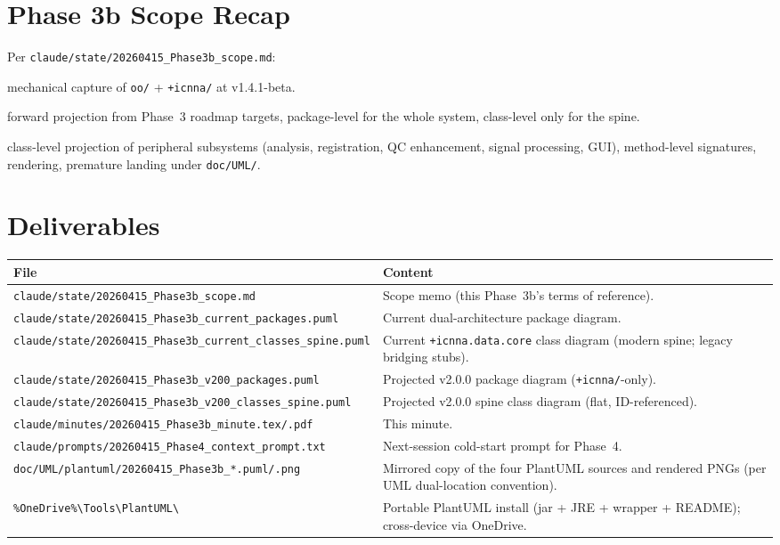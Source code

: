 \documentclass[11pt,a4paper]{article}
\begin{document}
\section{Phase 3b Scope Recap}

Per \texttt{claude/state/20260415\_Phase3b\_scope.md}:

\begin{description}[style=nextline]
    \item[3b.1 (current snapshot):] mechanical capture of \texttt{oo/} + \texttt{+icnna/} at v1.4.1-beta.
    \item[3b.2 (v2.0.0 projection):] forward projection from Phase~3 roadmap targets, package-level for the whole system, class-level only for the spine.
    \item[Non-goals:] class-level projection of peripheral subsystems (analysis, registration, QC enhancement, signal processing, GUI), method-level signatures, rendering, premature landing under \texttt{doc/UML/}.
\end{description}

\section{Deliverables}

\begin{longtable}{p{6.2cm}p{8.0cm}}
\toprule
\textbf{File} & \textbf{Content} \\
\midrule
\endhead
\texttt{claude/state/20260415\_Phase3b\_scope.md} & Scope memo (this Phase~3b's terms of reference). \\
\texttt{claude/state/20260415\_Phase3b\_current\_packages.puml} & Current dual-architecture package diagram. \\
\texttt{claude/state/20260415\_Phase3b\_current\_classes\_spine.puml} & Current \texttt{+icnna.data.core} class diagram (modern spine; legacy bridging stubs). \\
\texttt{claude/state/20260415\_Phase3b\_v200\_packages.puml} & Projected v2.0.0 package diagram (\texttt{+icnna/}-only). \\
\texttt{claude/state/20260415\_Phase3b\_v200\_classes\_spine.puml} & Projected v2.0.0 spine class diagram (flat, ID-referenced). \\
\texttt{claude/minutes/20260415\_Phase3b\_minute.tex/.pdf} & This minute. \\
\texttt{claude/prompts/20260415\_Phase4\_context\_prompt.txt} & Next-session cold-start prompt for Phase~4. \\
\texttt{doc/UML/plantuml/20260415\_Phase3b\_*.puml/.png} & Mirrored copy of the four PlantUML sources and rendered PNGs (per UML dual-location convention). \\
\texttt{\%OneDrive\%\textbackslash Tools\textbackslash PlantUML\textbackslash} & Portable PlantUML install (jar + JRE + wrapper + README); cross-device via OneDrive. \\
\bottomrule
\end{longtable}
\end{document}
